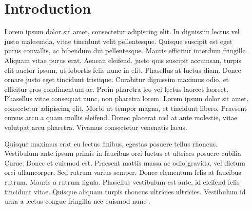 \chapter{Introduction}\label{ch:introduction}

 Lorem ipsum dolor sit amet, consectetur adipiscing elit. In dignissim lectus vel justo malesuada, vitae tincidunt velit pellentesque. Quisque suscipit est eget purus convallis, ac bibendum dui pellentesque. Mauris efficitur interdum fringilla. Aliquam vitae purus erat. Aenean eleifend, justo quis suscipit accumsan, turpis elit auctor ipsum, ut lobortis felis nunc in elit. Phasellus at luctus diam. Donec ornare justo eget tincidunt tristique. Curabitur dignissim maximus odio, et efficitur eros condimentum ac. Proin pharetra leo vel lectus laoreet laoreet. Phasellus vitae consequat nunc, non pharetra lorem. Lorem ipsum dolor sit amet, consectetur adipiscing elit. Morbi ut tempor magna, et tincidunt libero. Praesent cursus arcu a quam mollis eleifend. Donec placerat nisl at ante molestie, vitae volutpat arcu pharetra. Vivamus consectetur venenatis lacus.

Quisque maximus erat eu lectus finibus, egestas posuere tellus rhoncus. Vestibulum ante ipsum primis in faucibus orci luctus et ultrices posuere cubilia Curae; Donec et euismod est. Praesent mattis massa ac odio gravida, vel dictum orci ullamcorper. Sed rutrum varius semper. Donec elementum felis at faucibus rutrum. Mauris a rutrum ligula. Phasellus vestibulum est ante, id eleifend felis tincidunt vitae. Quisque aliquam turpis rhoncus ultricies ultricies. Vestibulum id urna a lectus congue fringilla nec euismod nunc \citep{Example}.

